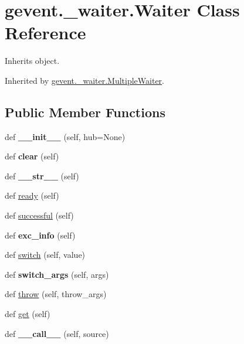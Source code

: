 \hypertarget{classgevent_1_1__waiter_1_1_waiter}{}\section{gevent.\+\_\+waiter.\+Waiter Class Reference}
\label{classgevent_1_1__waiter_1_1_waiter}


Inherits object.



Inherited by \hyperlink{classgevent_1_1__waiter_1_1_multiple_waiter}{gevent.\+\_\+waiter.\+Multiple\+Waiter}.

\subsection*{Public Member Functions}
\begin{DoxyCompactItemize}
\item 
\mbox{\label{classgevent_1_1__waiter_1_1_waiter_abbe85c934b3fc6f4a34eea3fc4826316}} 
def {\bfseries \+\_\+\+\_\+init\+\_\+\+\_\+} (self, hub=None)
\item 
\mbox{\label{classgevent_1_1__waiter_1_1_waiter_a1734167f1ea15eea997267677939ff6b}} 
def {\bfseries clear} (self)
\item 
\mbox{\label{classgevent_1_1__waiter_1_1_waiter_a341a45ec58e780285455bffc8df621b0}} 
def {\bfseries \+\_\+\+\_\+str\+\_\+\+\_\+} (self)
\item 
def \hyperlink{classgevent_1_1__waiter_1_1_waiter_a337f9b6eef9c4f2ed53fcd0c2aed1c05}{ready} (self)
\item 
def \hyperlink{classgevent_1_1__waiter_1_1_waiter_a4480be01e5cd9a6ff84be6343a6c2d86}{successful} (self)
\item 
\mbox{\label{classgevent_1_1__waiter_1_1_waiter_a2c981bb4898105cdec7c0539b45140f5}} 
def {\bfseries exc\+\_\+info} (self)
\item 
def \hyperlink{classgevent_1_1__waiter_1_1_waiter_ac31aa2cdc2a7aac4cf2d9e4ea5bb526f}{switch} (self, value)
\item 
\mbox{\label{classgevent_1_1__waiter_1_1_waiter_a220df6575e4be8ce2049a3f57cedb6a9}} 
def {\bfseries switch\+\_\+args} (self, args)
\item 
def \hyperlink{classgevent_1_1__waiter_1_1_waiter_a1d8d060e34ca91799fdd761b5dbea82a}{throw} (self, throw\+\_\+args)
\item 
def \hyperlink{classgevent_1_1__waiter_1_1_waiter_aabc14be0f3dc9a5490399e0138b3ce6e}{get} (self)
\item 
\mbox{\label{classgevent_1_1__waiter_1_1_waiter_a18e7c7a4dd5ad63d11f3e7c67ac97b3e}} 
def {\bfseries \+\_\+\+\_\+call\+\_\+\+\_\+} (self, source)
\end{DoxyCompactItemize}
